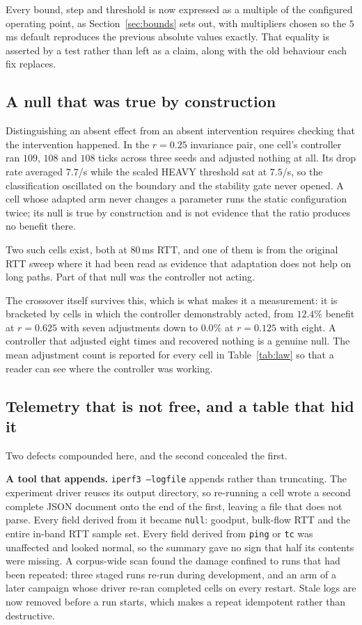 Every bound, step and threshold is now expressed as a multiple of the
configured operating point, as Section~\ref{sec:bounds} sets out, with
multipliers chosen so the $5$\,ms default reproduces the previous absolute
values exactly. That equality is asserted by a test rather than left as a
claim, along with the old behaviour each fix replaces.

\subsection{A null that was true by construction}
\label{sec:pitfall:inert}

Distinguishing an absent effect from an absent intervention requires checking
that the intervention happened. In the $r = 0.25$ invariance pair, one cell's
controller ran $109$, $108$ and $108$ ticks across three seeds and adjusted
nothing at all. Its drop rate averaged $7.7$/s while the scaled HEAVY threshold
sat at $7.5$/s, so the classification oscillated on the boundary and the
stability gate never opened. A cell whose adapted arm never changes a parameter
runs the static configuration twice; its null is true by construction and is
not evidence that the ratio produces no benefit there.

Two such cells exist, both at $80$\,ms RTT, and one of them is from the
original RTT sweep where it had been read as evidence that adaptation does not
help on long paths. Part of that null was the controller not acting.

The crossover itself survives this, which is what makes it a measurement: it is
bracketed by cells in which the controller demonstrably acted, from $12.4\%$
benefit at $r = 0.625$ with seven adjustments down to $0.0\%$ at $r = 0.125$
with eight. A controller that adjusted eight times and recovered nothing is a
genuine null. The mean adjustment count is reported for every cell in
Table~\ref{tab:law} so that a reader can see where the controller was working.

\subsection{Telemetry that is not free, and a table that hid it}
\label{sec:pitfall:telemetry}

Two defects compounded here, and the second concealed the first.

\textbf{A tool that appends.} \texttt{iperf3 --logfile} appends rather than
truncating. The experiment driver reuses its output directory, so re-running a
cell wrote a second complete JSON document onto the end of the first, leaving
a file that does not parse. Every field derived from it became
\texttt{null}: goodput, bulk-flow RTT and the entire in-band RTT sample set.
Every field derived from \texttt{ping} or \texttt{tc} was unaffected and
looked normal, so the summary gave no sign that half its contents were
missing. A corpus-wide scan found the damage confined to runs that had been
repeated: three staged runs re-run during development, and an arm of a later
campaign whose driver re-ran completed cells on every restart. Stale logs are
now removed before a run starts, which makes a repeat idempotent rather than
destructive.

